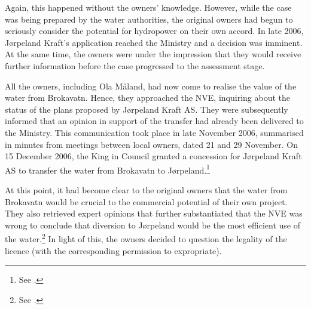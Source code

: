 Again, this happened without the owners' knowledge. However, while the case was being prepared by the water authorities, the original owners had begun to seriously consider the potential for hydropower on their own accord. In late 2006, Jørpeland Kraft's application reached the Ministry and a decision was imminent. At the same time, the owners were under the impression that they would receive further information before the case progressed to the assessment stage.

All the owners, including Ola Måland, had now come to realise the value of the water from Brokavatn. Hence, they approached the NVE, inquiring about the status of the plans proposed by Jørpeland Kraft AS. They were subsequently informed that an opinion in support of the transfer had already been delivered to the Ministry. This communication took place in late November 2006, summarised in minutes from meetings between local owners, dated 21 and 29 November. On 15 December 2006, the King in Council granted a concession for Jørpeland Kraft AS to transfer the water from Brokavatn to Jørpeland.\footnote{See \cite[3]{jorpeland09}.}

At this point, it had become clear to the original owners that the water from Brokavatn would be crucial to the commercial potential of their own project. They also retrieved expert opinions that further substantiated that the NVE was wrong to conclude that diversion to Jørpeland would be the most efficient use of the water.\footnote{See \cite[23]{jorpeland09}.} In light of this, the owners decided to question the legality of the licence (with the corresponding permission to expropriate).

